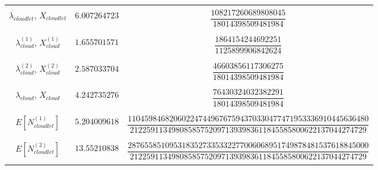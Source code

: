 \documentclass[10pt,a4paper]{article}
\begin{document}
\begin{table}[h!]
\begin{adjustbox}{center=\textwidth}
\begin{tabular}{c|c|c}
	 &&\\\hline &&\\

     $\lambda_{cloudlet}$, $X_{cloudlet}$ & $6.007264723$ & $\dfrac{108217260689808045}{18014398509481984}$ \\

     &&\\\hline &&\\

     $\lambda_{cloud}^{(1)}$, $X_{cloud}^{(1)}$ & $1.655701571$ & $\dfrac{1864154244692251}{1125899906842624}$ \\

	 &&\\\hline &&\\

     $\lambda_{cloud}^{(2)}$, $X_{cloud}^{(2)}$ & $2.587033704$ & $\dfrac{46603856117306275}{18014398509481984}$ \\

	 &&\\\hline &&\\

     $\lambda_{cloud}$, $X_{cloud}$ & $4.242735276$ & $\dfrac{76430324032382291}{18014398509481984}$ \\

     &&\\\hline &&\\
     
	 $E[N^{(1)}_{cloudlet}]$ & $5.204009618$ & $\dfrac{1104598468206022474496767594370330477471953336910445636480}{212259113498085857520971393983611845585800622137044274729}$ \\
     
     &&\\\hline &&\\
     
     $E[N^{(2)}_{cloudlet}]$ & $13.55210838$ & $\dfrac{2876558510953183527335332277006068951749878481537618845000}{212259113498085857520971393983611845585800622137044274729}$ \\
     
	 &&\\

     \bottomrule

    \end{tabular}
    \end{adjustbox}
\end{table}
\end{document}
